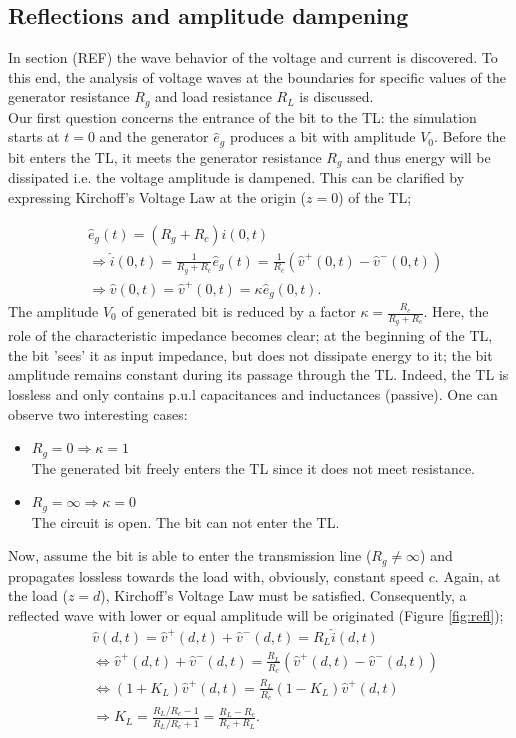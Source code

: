\subsection{Reflections and amplitude dampening}
In section (REF) the wave behavior of the voltage and current is discovered. To this end, the analysis of voltage waves at the boundaries for specific values of the generator resistance $R_g$ and load resistance $R_L$ is discussed. \\

Our first question concerns the entrance of the bit to the TL: the simulation starts at $t=0$ and the generator $\hat{e}_g$ produces a bit with amplitude $V_0$. Before the bit enters the TL, it meets the generator resistance $R_g$ and thus energy will be dissipated i.e. the voltage amplitude is dampened. This can be clarified by expressing Kirchoff's Voltage Law at the origin ($z=0$) of the TL;

\begin{align}
&\hat{e}_g(t) = (R_g + R_c)\hat{i}(0, t) \\
&\Rightarrow \hat{i}(0, t) = \frac{1}{R_g+R_c}\hat{e}_g(t)= \frac{1}{R_c}(\hat{v}^{+}(0, t) - \hat{v}^{-}(0, t)) \\
&\Rightarrow \hat{v}(0, t) = \hat{v}^{+}(0, t) =\kappa\hat{e}_g(0, t)\label{enter}.
\end{align}
The amplitude $V_0$ of generated bit is reduced by a factor $\kappa = \frac{R_c}{R_g + R_c}$. Here, the role of the characteristic impedance becomes clear; at the beginning of the TL, the bit 'sees' it as input impedance, but does not dissipate energy to it; the bit amplitude remains constant during its passage through the TL. Indeed, the TL is lossless and only contains p.u.l capacitances and inductances (passive). One can observe two interesting cases:
\begin{itemize}
\item $R_g = 0 \Rightarrow \kappa = 1$\\ The generated bit freely enters the TL since it does not meet resistance.
\item $R_g = \infty \Rightarrow \kappa = 0$ \\ The circuit is open. The bit can not enter the TL.
\end{itemize}

Now, assume the bit is able to enter the transmission line ($R_g \neq \infty$) and propagates lossless towards the load with, obviously, constant speed $c$. Again, at the load ($z=d$), Kirchoff's Voltage Law must be satisfied. Consequently, a reflected wave with lower or equal amplitude will be originated (Figure \ref{fig:refl});
\begin{align}
&\hat{v}(d, t) = \hat{v}^{+}(d, t) + \hat{v}^{-}(d, t) = R_L\hat{i}(d, t) \\
&\Leftrightarrow \hat{v}^{+}(d, t) + \hat{v}^{-}(d, t) = \frac{R_L}{R_c}(\hat{v}^{+}(d, t) - \hat{v}^{-}(d, t)) \\
&\Leftrightarrow (1 + K_L)\hat{v}^{+}(d, t) = \frac{R_L}{R_c}(1 - K_L)\hat{v}^{+}(d, t) \\
&\Rightarrow K_L = \frac{R_L/R_c - 1}{R_L/R_c + 1} = \frac{R_L - R_c}{R_c + R_L}.
\end{align}


